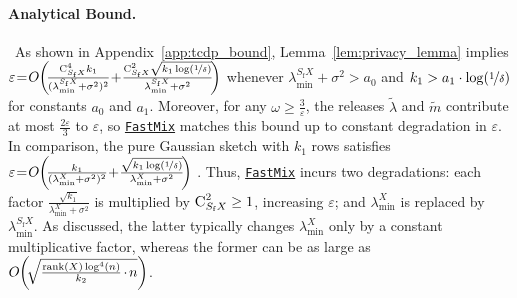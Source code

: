 \documentclass[11pt]{article}
\theoremstyle{definition}
\theoremstyle{plain}
\providecommand{\lemmaref}[1]{Lemma~\ref{#1}}
\providecommand{\appendixref}[1]{Appendix~\ref{#1}}
\newcommand{\eps}{{\varepsilon}}
\renewcommand{\eps}{\varepsilon}
\newcommand{\FastMix}{\hyperref[alg:fast_mixing]{\texttt{FastMix}}\xspace}
\begin{document}
\paragraph{Analytical Bound.} \
As shown in \appendixref{app:tcdp_bound}, \lemmaref{lem:privacy_lemma} implies $\eps \hspace{-0.2em}=\hspace{-0.2em} O\hspace{-0.2em}\left(\hspace{-0.2em}\tfrac{\textsc{C}^4_{S_{\mathrm{f}}X}k_1}{(\lambda^{S_{\mathrm{f}}X}_{\min} + \sigma^2)^2} \hspace{-0.2em}+\hspace{-0.2em} \tfrac{\textsc{C}^2_{S_{\mathrm{f}}X}\sqrt{k_1\log(\nicefrac{1}{\delta})}}{\lambda^{S_{\mathrm{f}}X}_{\min} + \sigma^2}\hspace{-0.2em}\right)$ whenever $\lambda^{S_{\mathrm{f}}X}_{\min} + \sigma^2 > a_0$ and $k_1 > a_1 \cdot \log(\nicefrac{1}{\delta})$ for constants $a_0$ and $a_1$. Moreover, for any $\omega \geq \frac{3}{\eps}$, the releases $\widetilde{\lambda}$ and $\widetilde{m}$ contribute at most $\frac{2\eps}{3}$ to $\eps$, so \FastMix matches this bound up to constant degradation in $\eps$. In comparison, the pure Gaussian sketch with $k_1$ rows satisfies $\eps \hspace{-0.2em}=\hspace{-0.2em} O\hspace{-0.2em}\left(\hspace{-0.2em}\tfrac{k_1}{(\lambda^{X}_{\min} + \sigma^2)^2} \hspace{-0.2em}+\hspace{-0.2em} \tfrac{\sqrt{k_1\log(\nicefrac{1}{\delta})}}{\lambda^{X}_{\min} + \sigma^2}\hspace{-0.2em}\right)$ \citep[Section~4]{lev2025gaussianmix}. Thus, \FastMix incurs two degradations: each factor $\tfrac{\sqrt{k_1}}{\lambda^{X}_{\min} + \sigma^2}$ is multiplied by $\textsc{C}^2_{S_{\mathrm{f}}X} \geq 1$, increasing $\eps$; and $\lambda^{X}_{\min}$ is replaced by $\lambda^{S_{\mathrm{f}}X}_{\min}$. As discussed, the latter typically changes $\lambda^{X}_{\min}$ only by a constant multiplicative factor, whereas the former can be as large as $O\hspace{-0.2em}\left(\hspace{-0.2em}\sqrt{\frac{\mathrm{rank}(X)\log^4(n)}{k_2}\hspace{-0.1em}\cdot\hspace{-0.1em}n}\right)$.
\end{document}
